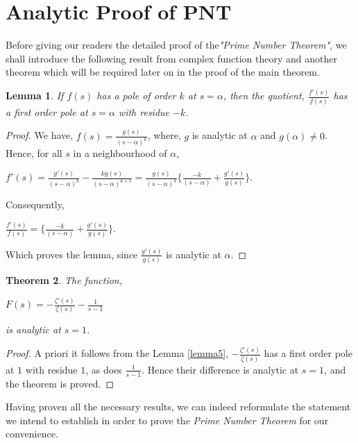 \documentclass[article,12pt]{elsarticle}
\newtheorem{thm}{Theorem}[section]
\newtheorem{lemma}[thm]{Lemma}
\begin{document}
	\section{Analytic Proof of PNT}	
	Before giving our readers the detailed proof of the\textit{"Prime Number Theorem"}, we shall introduce the following result from complex function theory and another theorem which will be required later on in the proof of the main theorem.
	\begin{lemma}\label{lemma5}
		If $f(s)$ has a pole of order $k$ at $s=\alpha$, then the quotient, $\frac{f'(s)}{f(s)}$ has a first order pole at $s=\alpha$ with residue $-k$.
	\end{lemma}
	\begin{proof}
		We have,  $f(s)=\frac{g(s)}{(s-\alpha)^{k}}$,  where, $g$ is analytic at $\alpha$ and $g(\alpha)\neq 0$. Hence, for all $s$ in a neighbourhood of $\alpha$, 
		\begin{center}
			$f'(s)=\frac{g'(s)}{(s-\alpha)^{k}}-\frac{kg(s)}{(s-\alpha)^{k+1}}=\frac{g(s)}{(s-\alpha)^{k}}\{\frac{-k}{(s-\alpha)}+\frac{g'(s)}{g(s)}\}$.
		\end{center}	
		Consequently,
		\begin{center}
			$\frac{f'(s)}{f(s)}=\{\frac{-k}{(s-\alpha)}+\frac{g'(s)}{g(s)}\}$.
		\end{center}	
		Which proves the lemma, since $\frac{g'(s)}{g(s)}$ is analytic at $\alpha$.
	\end{proof}
	\begin{thm}\label{thm16}
		The function,
		\begin{center}
			$F(s)=-\frac{\zeta'(s)}{\zeta(s)}-\frac{1}{s-1}$
		\end{center}
		is analytic at $s=1$.
	\end{thm}
	\begin{proof}
		A priori it follows from the Lemma \eqref{lemma5},  $-\frac{\zeta'(s)}{\zeta(s)}$ has a first order pole at $1$ with residue $1$, as does $\frac{1}{s-1}$. Hence their difference is analytic at $s=1$, and the theorem is proved.
	\end{proof}
	Having proven all the necessary results, we can indeed reformulate the statement we intend to establish in order to prove the \textit{Prime Number Theorem} for our convenience.
\end{document}
